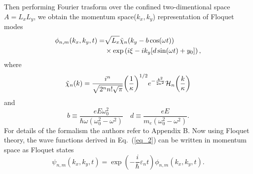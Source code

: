 Then performing Fourier trasform over the confined two-dimentional space $A=L_xL_y$, we obtain the momentum space($k_x,k_y$) representation of Floquet modes
\begin{equation} \label{eq_9}
  \begin{aligned}
    \phi_{n,m}(k_x,k_y,t)  = &
    {\sqrt{L_x}}
    \tilde{\chi}_{n}\qty(k_y - b\cos(\omega t)) \\
    & \times
    \text{exp}\left(
      i\xi
      -ik_y  \qty[d\sin(\omega t) + y_0]
    \right),
  \end{aligned}
\end{equation}
where
\begin{equation} \label{eq_10}
  \tilde{\chi}_{n}\qty(k) =
  \frac{i^n}{\sqrt{2^{n} n! \sqrt{\pi}}}
  \qty(\frac{1}{\kappa})^{1/2}
  e^{-\frac{k^2}{2 \kappa^2}}
  \mathcal{H}_{n} \qty(\frac{k}{\kappa})
\end{equation}
and
\begin{equation} \label{eq_11}
  b \equiv
  \frac{eE\omega_0^2}{\hbar\omega(\omega_0^2 - \omega^2)} \quad
  d \equiv
 \frac{eE}{m_e(\omega_0^2 - \omega^2)}.
\end{equation}
For details of the formalism the authors refer to Appendix B. Now using Floquet theory, the wave functions derived in Eq.~(\ref{eq_2}) can be written in momentum space as Floquet states
\begin{equation} \label{eq_12}
  \psi_{n,m}(k_x,k_y,t) =
  \exp(-\frac{i}{\hbar}\varepsilon_{n}t)   \phi_{n,m} (k_x,k_y,t).
\end{equation}
